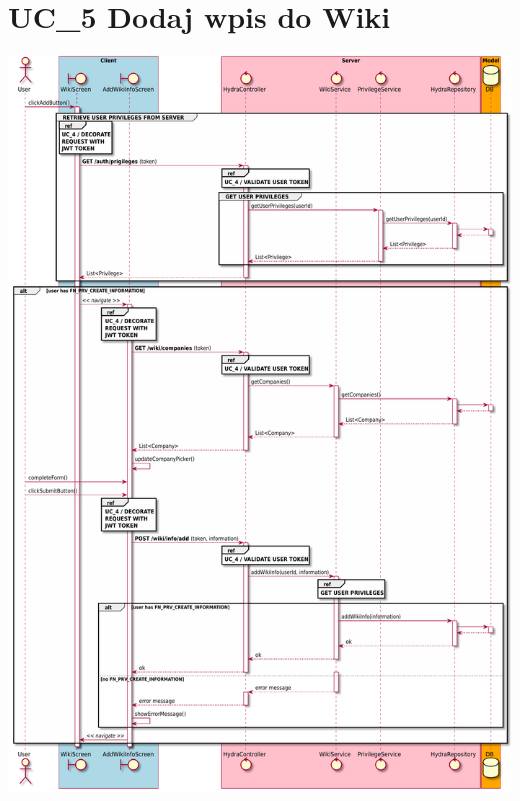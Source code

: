\documentclass[oneside]{scrreprt}
\begin{document}
\section{UC\_5 Dodaj wpis do Wiki}
\includegraphics[width=\textwidth, keepaspectratio]{graphics/sequence_diagram_wiki_add.pdf}
\end{document}
